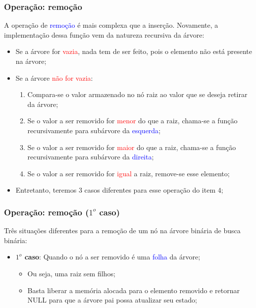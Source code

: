 \documentclass{beamer}
\newcommand{\tcb}[1]{\textcolor{blue}{#1}}
\newcommand{\tcr}[1]{\textcolor{red}{#1}}
\begin{document}
\begin{frame}
  \frametitle{Operação: remoção}

  A operação de \tcb{remoção} é mais complexa que a inserção.
  Novamente, a implementação dessa função vem da natureza recursiva da árvore:
  \begin{itemize}
    \item Se a árvore for \tcr{vazia}, nada tem de ser feito, pois o elemento não
      está presente na árvore;
    \item Se a árvore \tcr{não for vazia}:
      \begin{enumerate}
        \item Compara-se o valor armazenado no nó raiz ao valor que se
          deseja retirar da árvore;
        \item Se o valor a ser removido for \tcr{menor} do que a raiz, chama-se a
          função recursivamente para subárvore da \tcb{esquerda};
        \item Se o valor a ser removido for \tcr{maior} do que a raiz, chama-se a
          função recursivamente para subárvore da \tcb{direita};
        \item Se o valor a ser removido for \tcr{igual} a raiz, remove-se esse elemento;
      \end{enumerate}

    \item Entretanto, teremos 3 casos diferentes para esse operação do item $4$;
  \end{itemize}
\end{frame}

\begin{frame}
  \frametitle{Operação: remoção ($1^o$ caso)}

  Três situações diferentes para a remoção de um nó na árvore binária de busca binária:

  \begin{itemize}
    \item \textbf{$1^o$ caso}: Quando o nó a ser removido é uma \tcb{folha} da árvore;
    \begin{itemize}
      \item Ou seja, uma raiz sem filhos;
      \item Basta liberar a memória alocada para o elemento removido e retornar NULL para que
        a árvore pai possa atualizar seu estado;
    \end{itemize}
  \end{itemize}

\end{frame}
\end{document}
